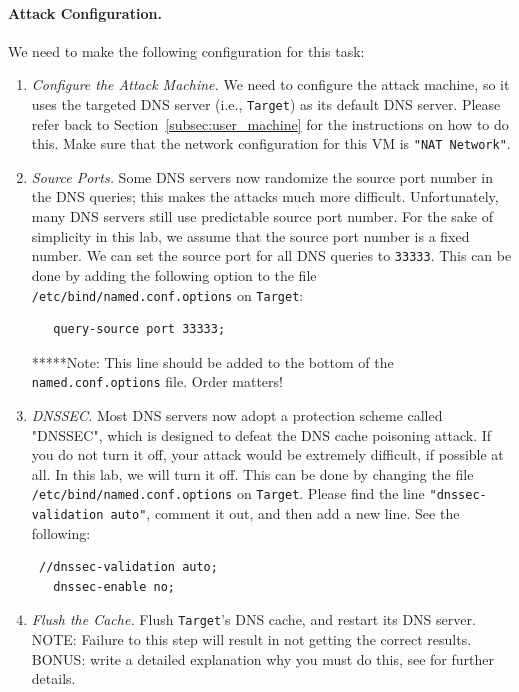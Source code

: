 \paragraph{Attack Configuration.} We need to make the following configuration
for this task:

\begin{enumerate}

\item {\em Configure the Attack Machine.} 
We need to configure the attack machine, so it uses the targeted 
DNS server (i.e., {\tt Target}) as its default DNS server. Please 
refer back to Section~\ref{subsec:user_machine} for the instructions on how to do this. 
Make sure that the network configuration
for this VM is {\tt "NAT Network"}.


\item {\em Source Ports.} Some DNS servers now randomize the source port number 
in the DNS queries; this makes the attacks much more difficult. Unfortunately, 
many DNS servers still use predictable source port number.  
For the sake of simplicity in this lab, we assume that the source port 
number is a fixed number. We can set the source port for all DNS queries 
to {\tt 33333}. This can be done by
adding the following option to the file {\tt /etc/bind/named.conf.options}
on {\tt Target}:
\begin{verbatim}
   query-source port 33333;
\end{verbatim}

*****Note: This line should be added to the bottom of the {\tt named.conf.options} file. Order matters!

\item {\em DNSSEC.}
Most DNS servers now adopt a protection scheme called "DNSSEC", which is
designed to defeat the DNS cache poisoning attack.  If you do not turn
it off, your attack would be extremely difficult, if possible at all. 
In this lab, we will turn it off.
This can be done by changing 
the file {\tt /etc/bind/named.conf.options} on {\tt Target}. Please find the line 
{\tt "dnssec-validation auto"}, comment it out, and then add a new line. See
the following:
\begin{verbatim}
 //dnssec-validation auto;
   dnssec-enable no;
\end{verbatim}


\item {\em Flush the Cache.}
Flush {\tt Target}'s  DNS cache, and restart its DNS server. NOTE: Failure to this step will result in not getting the correct results.  BONUS: write a detailed explanation why you must do this, see  for further details.


\end{enumerate}


